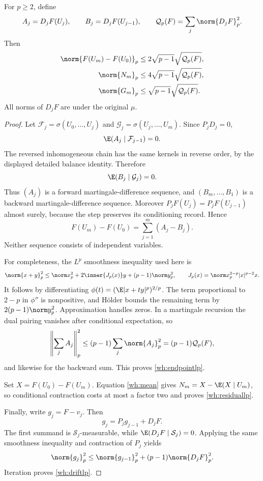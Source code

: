 \begin{lemma}
\label{wh:martingale}
For \(p\ge2\), define
\[
 A_j=D_jF(U_j),\qquad B_j=D_jF(U_{j-1}),\qquad
 \mathcal Q_p(F)=\sum_j\norm{D_jF}_p^2.
\]
Then
\begin{align}
 \norm{F(U_m)-F(U_0)}_p
 &\le2\sqrt{p-1}\sqrt{\mathcal Q_p(F)}, \label{wh:endpointlp}\\
 \norm{N_m}_p
 &\le4\sqrt{p-1}\sqrt{\mathcal Q_p(F)}, \label{wh:residuallp}\\
 \norm{G_m}_p
 &\le\sqrt{p-1}\sqrt{\mathcal Q_p(F)}. \label{wh:driftlp}
\end{align}
All norms of \(D_jF\) are under the original \(\mu\).
\end{lemma}
\begin{proof}
Let \(\mathcal F_j=\sigma(U_0,\ldots,U_j)\) and
\(\mathcal G_j=\sigma(U_j,\ldots,U_m)\). Since \(P_jD_j=0\),
\[
 \E(A_j\mid\mathcal F_{j-1})=0.
\]
The reversed inhomogeneous chain has the same kernels in reverse order, by the displayed detailed balance identity. Therefore
\[
 \E(B_j\mid\mathcal G_j)=0.
\]
Thus \((A_j)\) is a forward martingale-difference sequence, and \((B_m,\ldots,B_1)\) is a backward martingale-difference sequence. Moreover \(P_jF(U_j)=P_jF(U_{j-1})\) almost surely, because the step preserves its conditioning record. Hence
\begin{equation}
 F(U_m)-F(U_0)=\sum_{j=1}^m(A_j-B_j).
 \label{wh:twomartingales}
\end{equation}
Neither sequence consists of independent variables.

For completeness, the \(L^p\) smoothness inequality used here is
\[
 \norm{x+y}_p^2
 \le\norm x_p^2+2\inner{J_p(x)}y+(p-1)\norm y_p^2,
 \qquad
 J_p(x)=\norm x_p^{2-p}|x|^{p-2}x.
\]
It follows by differentiating
\(\phi(t)=(\E|x+ty|^p)^{2/p}\). The term proportional to \(2-p\) in \(\phi''\) is nonpositive, and Hölder bounds the remaining term by \(2(p-1)\norm y_p^2\). Approximation handles zeros. In a martingale recursion the dual pairing vanishes after conditional expectation, so
\[
 \left\|\sum_jA_j\right\|_p^2
 \le(p-1)\sum_j\norm{A_j}_p^2
 =(p-1)\mathcal Q_p(F),
\]
and likewise for the backward sum. This proves \eqref{wh:endpointlp}.

Set \(X=F(U_0)-F(U_m)\). Equation \eqref{wh:mean} gives
\(N_m=X-\E(X\mid U_m)\), so conditional contraction costs at most a factor two and proves \eqref{wh:residuallp}.

Finally, write \(g_j=F-v_j\). Then
\[
 g_j=P_jg_{j-1}+D_jF.
\]
The first summand is \(\mathcal S_j\)-measurable, while
\(\E(D_jF\mid\mathcal S_j)=0\). Applying the same smoothness inequality and contraction of \(P_j\) yields
\[
 \norm{g_j}_p^2\le\norm{g_{j-1}}_p^2+(p-1)\norm{D_jF}_p^2.
\]
Iteration proves \eqref{wh:driftlp}.
\end{proof}

